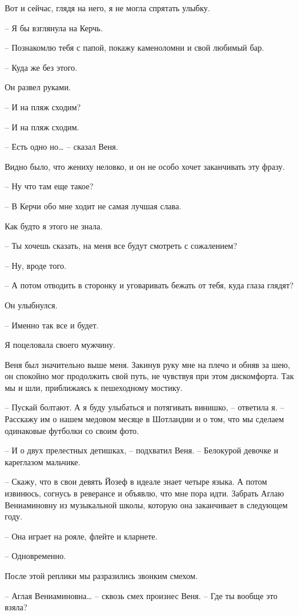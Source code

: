 \documentclass[
]{book}
\begin{document}
Вот и сейчас, глядя на него, я не могла спрятать улыбку.

-- Я бы взглянула на Керчь.

-- Познакомлю тебя с папой, покажу каменоломни и свой любимый бар.

-- Куда же без этого.

Он развел руками.

-- И на пляж сходим?

-- И на пляж сходим.

-- Есть одно но\ldots{} -- сказал Веня.

Видно было, что жениху неловко, и он не особо хочет заканчивать эту фразу.

-- Ну что там еще такое?

-- В Керчи обо мне ходит не самая лучшая слава.

Как будто я этого не знала.

-- Ты хочешь сказать, на меня все будут смотреть с сожалением?

-- Ну, вроде того.

-- А потом отводить в сторонку и уговаривать бежать от тебя, куда глаза глядят?

Он улыбнулся.

-- Именно так все и будет.

Я поцеловала своего мужчину.

Веня был значительно выше меня. Закинув руку мне на плечо и обняв за шею, он спокойно мог продолжить свой путь, не чувствуя при этом дискомфорта. Так мы и шли, приближаясь к пешеходному мостику.

-- Пускай болтают. А я буду улыбаться и потягивать винишко, -- ответила я. -- Расскажу им о нашем медовом месяце в Шотландии и о том, что мы сделаем одинаковые футболки со своим фото.

-- И о двух прелестных детишках, -- подхватил Веня. -- Белокурой девочке и кареглазом мальчике.

-- Скажу, что в свои девять Йозеф в идеале знает четыре языка. А потом извинюсь, согнусь в реверансе и объявлю, что мне пора идти. Забрать Аглаю Вениаминовну из музыкальной школы, которую она заканчивает в следующем году.

-- Она играет на рояле, флейте и кларнете.

-- Одновременно.

После этой реплики мы разразились звонким смехом.

-- Аглая Вениаминовна\ldots{} -- сквозь смех произнес Веня. -- Где ты вообще это взяла?
\end{document}
